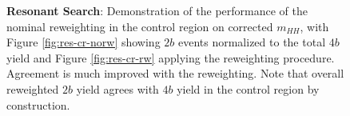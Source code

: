 \begin{figure}[ht]
  \centering
  \caption{\label{fig:res-cr-mhh} \textbf{Resonant Search}: Demonstration of the performance of the nominal 
  reweighting in the control region on corrected $m_{HH}$, with Figure \ref{fig:res-cr-norw} showing 
  $2b$ events normalized to the total $4b$ yield and Figure \ref{fig:res-cr-rw} applying the 
  reweighting procedure. Agreement is much improved with the reweighting. Note that overall 
  reweighted $2b$ yield agrees with $4b$ yield in the control region by construction.}
\end{figure}

